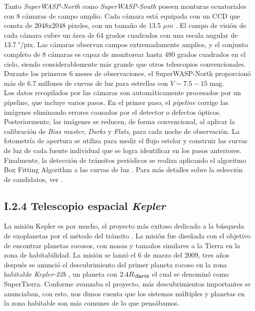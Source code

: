 Tanto \textit{SuperWASP-North} como \textit{SuperWASP-South} poseen monturas ecuatoriales con 8 cámaras de campo amplio. Cada cámara está equipada con un CCD que consta de 2048x2048 pixeles, con un tamaño de 13.5 $	\mu m$ . El campo de visión de cada cámara cubre un área de 64 grados cuadrados con una escala angular de 13.7 \''/pix. Las cámaras observan campos extremadamente amplios, y el conjunto completo de 8 cámaras es capaz de monitorear hasta 480 grados cuadrados en el cielo, siendo considerablemente más grande que otros telescopios convencionales. Durante los primeros 6 meses de observaciones, el SuperWASP-North proporcionó más de 6.7 millones de curvas de luz para estrellas con $V \sim 7.5-15$ mag.\\


Los datos recopilados por las cámaras son automáticamente procesados por un pipeline, que incluye varios pasos. En el primer paso, el \textit{pipeline} corrige las imágenes eliminando errores causados por el detector o defectos ópticos. Posteriormente, las imágenes se reducen, de forma convencional, al aplicar la calibración de \textit{Bias master}, \textit{Darks} y \textit{Flats}, para cada noche de observación. La fotometría de apertura se utiliza para medir el flujo estelar y construir las curvas de luz de cada fuente individual que se logra identificar en los pasos anteriores. Finalmente, la detección de tránsitos periódicos se realiza aplicando el algoritmo Box Fitting Algorithm a las curvas de luz \citep{kovacs2002box}. Para más detalles sobre la selección de candidatos, ver \cite{collier2006fast}.\\

\subsection*{I.2.4 Telescopio espacial \textit{Kepler}}

La misión Kepler es por mucho, el proyecto más exitoso dedicado a la búsqueda de exoplanetas por el método del tránsito \cite{borucki2010kepler}. La misión fue diseñada con el objetivo de encontrar planetas rocosos, con masas y tamaños similares a la Tierra en la zona de habitabilidad. La misión se lanzó el 6 de marzo del 2009, tres años después se
anunció el descubrimiento del primer planeta rocoso en la zona habitable \textit{Kepler-22b} \cite{borucki2012kepler}, un planeta con $2.4R_{\Earth}$ el cual se denominó como SuperTierra. Conforme avanzaba el proyecto, más descubrimientos importantes se anunciaban, con esto, nos dimos cuenta que los sistemas múltiples y planetas en la zona habitable son más comunes de lo que pensábamos.\\

